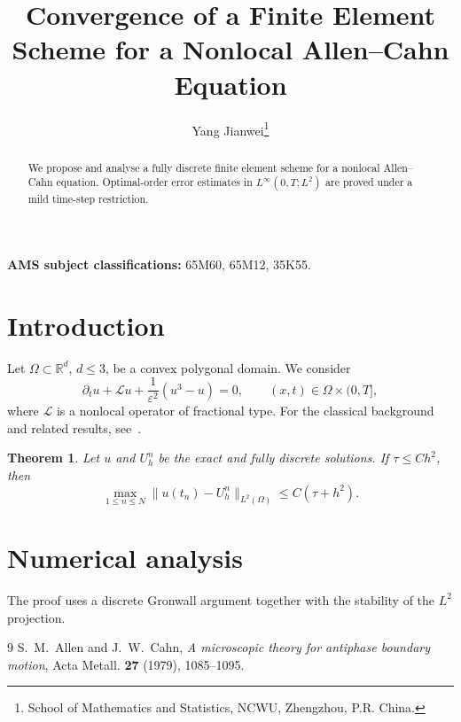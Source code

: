 \documentclass[siam,11pt]{siamart}
\title{Convergence of a Finite Element Scheme for a Nonlocal Allen--Cahn Equation}
\author{Yang Jianwei\thanks{School of Mathematics and Statistics, NCWU, Zhengzhou, P.R. China.}}
\date{}
\def\YTfallback{1}
\newtheorem{theorem}{Theorem}[section]
\newcommand{\R}{\mathbb{R}}
\newcommand{\Om}{\Omega}
\newcommand{\eps}{\varepsilon}
\begin{document}
\maketitle

\ifdefined\YTfallback
\noindent{}
\bigskip
\fi

\begin{abstract}\label{abs:siam}
We propose and analyse a fully discrete finite element scheme for a
nonlocal Allen--Cahn equation. Optimal-order error estimates in
$L^\infty(0,T;L^2)$ are proved under a mild time-step restriction.
\end{abstract}

\noindent\textbf{AMS subject classifications:} 65M60, 65M12, 35K55.

\section{Introduction}
Let $\Om\subset\R^d$, $d\le3$, be a convex polygonal domain. We consider
\begin{equation}\label{eq:ac}
  \partial_t u + \mathcal{L}u + \frac{1}{\eps^2}(u^3-u) = 0,
  \qquad (x,t)\in\Om\times(0,T],
\end{equation}
where $\mathcal{L}$ is a nonlocal operator of fractional type.
For the classical background and related results, see~\cite{AC}.

\begin{theorem}
Let $u$ and $U_h^n$ be the exact and fully discrete solutions. If
$\tau\le C h^{2}$, then
\begin{equation}
  \max_{1\le n\le N}\|u(t_n)-U_h^n\|_{L^2(\Om)}
  \le C(\tau + h^{2}).
\end{equation}
\end{theorem}

\section{Numerical analysis}
The proof uses a discrete Gronwall argument together with the
stability of the $L^2$ projection.


\begin{thebibliography}{9}
 S.~M.~Allen and J.~W.~Cahn, \emph{A microscopic theory for
antiphase boundary motion}, Acta Metall. \textbf{27} (1979), 1085--1095.
\end{thebibliography}
\end{document}
